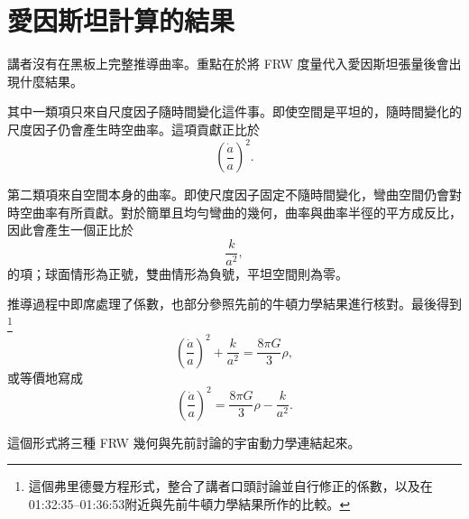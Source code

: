 \section{愛因斯坦計算的結果}

講者沒有在黑板上完整推導曲率。重點在於將 FRW 度量代入愛因斯坦張量後會出現什麼結果。

其中一類項只來自尺度因子隨時間變化這件事。即使空間是平坦的，隨時間變化的尺度因子仍會產生時空曲率。這項貢獻正比於
\begin{equation}
\left(\frac{\dot a}{a}\right)^2.
\end{equation}

第二類項來自空間本身的曲率。即使尺度因子固定不隨時間變化，彎曲空間仍會對時空曲率有所貢獻。對於簡單且均勻彎曲的幾何，曲率與曲率半徑的平方成反比，因此會產生一個正比於
\begin{equation}
\frac{k}{a^2},
\end{equation}
的項；球面情形為正號，雙曲情形為負號，平坦空間則為零。

\begin{classroomqa}
\end{classroomqa}

推導過程中即席處理了係數，也部分參照先前的牛頓力學結果進行核對。最後得到\footnote{這個弗里德曼方程形式，整合了講者口頭討論並自行修正的係數，以及在01:32:35--01:36:53附近與先前牛頓力學結果所作的比較。}
\begin{equation}
\left(\frac{\dot a}{a}\right)^2+\frac{k}{a^2}=\frac{8\pi G}{3}\rho,
\end{equation}
或等價地寫成
\begin{equation}
\left(\frac{\dot a}{a}\right)^2=\frac{8\pi G}{3}\rho-\frac{k}{a^2}.
\end{equation}

這個形式將三種 FRW 幾何與先前討論的宇宙動力學連結起來。

\begin{classroomqa}
\end{classroomqa}

\begin{classroomqa}
\end{classroomqa}

